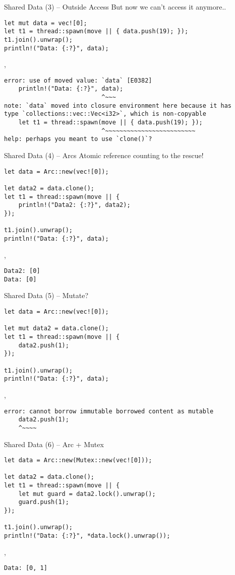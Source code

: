 \begin{frame}[fragile]{Shared Data (3) -- Outside Access}
But now we can't access it anymore..
\begin{verbatim}
let mut data = vec![0];
let t1 = thread::spawn(move || { data.push(19); });
t1.join().unwrap();
println!("Data: {:?}", data);
\end{verbatim}
\sep
\begin{verbatim}
error: use of moved value: `data` [E0382]
    println!("Data: {:?}", data);
                           ^~~~
note: `data` moved into closure environment here because it has
type `collections::vec::Vec<i32>`, which is non-copyable
    let t1 = thread::spawn(move || { data.push(19); });
                           ^~~~~~~~~~~~~~~~~~~~~~~~~~
help: perhaps you meant to use `clone()`?
\end{verbatim}
\end{frame}

\begin{frame}[fragile]{Shared Data (4) -- Arcs}
Atomic reference counting to the rescue!
\begin{verbatim}
let data = Arc::new(vec![0]);

let data2 = data.clone();
let t1 = thread::spawn(move || {
    println!("Data2: {:?}", data2);
});

t1.join().unwrap();
println!("Data: {:?}", data);
\end{verbatim}
\sep
\begin{verbatim}
Data2: [0]
Data: [0]
\end{verbatim}
\end{frame}

\begin{frame}[fragile]{Shared Data (5) -- Mutate?}
\begin{verbatim}
let data = Arc::new(vec![0]);

let mut data2 = data.clone();
let t1 = thread::spawn(move || {
    data2.push(1);
});

t1.join().unwrap();
println!("Data: {:?}", data);
\end{verbatim}
\sep
\begin{verbatim}
error: cannot borrow immutable borrowed content as mutable
    data2.push(1);
    ^~~~~
\end{verbatim}
\end{frame}

\begin{frame}[fragile]{Shared Data (6) -- Arc + Mutex}
\begin{verbatim}
let data = Arc::new(Mutex::new(vec![0]));

let data2 = data.clone();
let t1 = thread::spawn(move || {
    let mut guard = data2.lock().unwrap();
    guard.push(1);
});

t1.join().unwrap();
println!("Data: {:?}", *data.lock().unwrap());
\end{verbatim}
\sep
\begin{verbatim}
Data: [0, 1]
\end{verbatim}
\end{frame}

